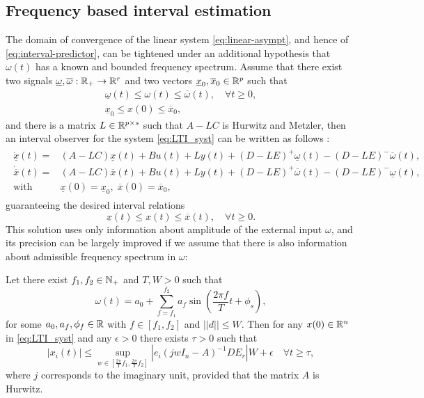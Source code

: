 \subsection{Frequency based interval estimation}
\label{sec:Frequency}
The domain of convergence of the linear system \eqref{eq:linear-asympt}, and hence of \eqref{eq:interval-predictor}, can be tightened under an additional hypothesis that $\omega(t)$ has a known and bounded frequency spectrum.
Assume that there exist two signals $\underline{\omega},\overline{\omega}:\mathbb{R}_{+}\to\mathbb{R}^{r}$ and two vectors $\underline{x}_{0},\overline{x}_{0}\in\mathbb{R}^{p}$ such that
\begin{gather*}
\underline{\omega}(t)\leq \omega(t)\leq\overline{\omega}(t),\quad\forall t\geq0,\\
\underline{x}_{0}\leq x(0)\leq\overline{x}_{0},
\end{gather*} and there is a matrix $L\in\mathbb{R}^{p\times s}$ such that $A-LC$ is Hurwitz and Metzler, then an interval observer for the system \eqref{eq:LTI_syst} can be written as follows \citep{REZ11}:
\begin{align}
\label{eq:IO_LTI}
\begin{split}
\dot{\underline{x}}(t) = {} & (A-LC)\underline{x}(t)+Bu(t) +Ly(t)  +(D-LE)^{+}\underline{\omega}(t)-(D-LE)^{-}\overline{\omega}(t), \\
\dot{\overline{x}}(t) = {} & (A-LC)\overline{x}(t)+Bu(t) +Ly(t)  +(D-LE)^{+}\overline{\omega}(t)-(D-LE)^{-}\underline{\omega}(t), \\
 \text{with }\, & \underline{x}(0)=\underline{x}_{0},\;\overline{x}(0)=\overline{x}_{0}, 
\end{split}
\end{align}
guaranteeing the desired interval relations
\[
\underline{x}(t)\leq x(t)\leq\overline{x}(t),\quad\forall t\geq0.
\]
This solution uses only information about amplitude of the external input $\omega$, and its precision can be largely improved if we assume that there is also information about admissible frequency spectrum in $\omega$:
\begin{lemma}
	\label{lem:IntFreq}
	\begin{leftbar}[lemmabar]
	Let there exist $f_{1},f_{2}\in\mathbb{N}_{+}$ and $T,W>0$
	such that
	\[
	\omega(t)=a_{0}+\sum_{f=f_{1}}^{f_{2}}a_{f}\sin\left(\frac{2\pi f}{T}t+\phi_{s}\right),
	\]
	for some $a_{0},a_{f},\phi_{f}\in\mathbb{R}$ with $f\in[f_{1},f_{2}]$ and $||d||\leq W$. Then for any $x(0)\in\mathbb{R}^{n}$ in \eqref{eq:LTI_syst} and any $\epsilon>0$ there exists $\tau>0$ such that
	\[
	|x_{i}(t)|\leq\sup_{w\in[\frac{2\pi}{T}f_{1},\frac{2\pi}{T}f_{2}]}|e_{i}(jwI_{n}-A)^{-1}DE_{r}|W+\epsilon\quad\forall t\geq\tau,
	\]
	where $j$ corresponds to the imaginary unit, provided that the matrix $A$ is Hurwitz.
	\end{leftbar}
\end{lemma}
